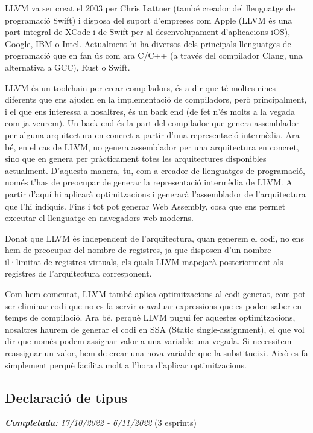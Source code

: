 ﻿\documentclass{article}
\begin{document}
LLVM va ser creat el 2003 per Chris Lattner (també creador del llenguatge de
programació Swift) i disposa del suport d'empreses com Apple (LLVM és una part
integral de XCode i de Swift per al desenvolupament d'aplicacions iOS), Google,
IBM o Intel. Actualment hi ha diversos dels principals llenguatges de
programació que en fan ús com ara C/C++ (a través del compilador Clang, una
alternativa a GCC), Rust o Swift.

LLVM és un toolchain per crear compiladors, és a dir que té moltes eines diferents
que ens ajuden en la implementació de compiladors, però principalment, i el que
ens interessa a nosaltres, és un back end (de fet n'és molts a la vegada com ja
veurem). Un back end és la part del compilador que genera assemblador per alguna
arquitectura en concret a partir d'una representació intermèdia. Ara bé, en el
cas de LLVM, no genera assemblador per una arquitectura en concret, sino que en
genera per pràcticament totes les arquitectures disponibles actualment.
D'aquesta manera, tu, com a creador de llenguatges de programació, només t'has
de preocupar de generar la representació intermèdia de LLVM. A partir d'aquí hi
aplicarà optimitzacions i generarà l'assemblador de l'arquitectura que l'hi
indiquis. Fins i tot pot generar Web Assembly, cosa que ens permet executar el
llenguatge en navegadors web moderns.

Donat que LLVM és independent de l'arquitectura, quan generem el codi, no ens
hem de preocupar del nombre de registres, ja que disposen d'un nombre il·limitat
de registres virtuals, els quals LLVM mapejarà posteriorment als registres de
l'arquitectura corresponent.

Com hem comentat, LLVM també aplica optimitzacions al codi generat, com pot ser
eliminar codi que no es fa servir o avaluar expressions que es poden saber en
temps de compilació. Ara bé, perquè LLVM pugui fer aquestes optimitzacions, 
nosaltres haurem de generar el codi en SSA (Static single-assignment), el que vol
dir que només podem assignar valor a una variable una vegada. Si necessitem 
reassignar un valor, hem de crear una nova variable que la substitueixi. Això es
fa simplement perquè facilita molt a l'hora d'aplicar optimitzacions.



\subsection{Declaració de tipus}
\textit{\textbf{Completada}: 17/10/2022 - 6/11/2022} (3 esprints)
\end{document}
